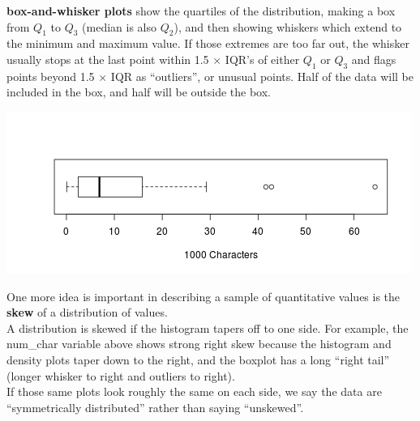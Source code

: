\begin{list}{}{}
\begin{list}{}{}
   \item [\bf box-and-whisker plots] show the quartiles of the
     distribution, making a box from $Q_1$ to $Q_3$ (median is also $Q_2$), and
     then showing whiskers which extend to the minimum and maximum
     value. If those extremes are too far out, the whisker usually
     stops at the last point within 1.5 $\times$ IQR's of either
     $Q_1$ or $Q_3$ and flags points beyond 1.5 $\times$ IQR as
     ``outliers'', or unusual points.  
     Half of the data will be included in the box, and half will be
     outside the box. \vspace{-1cm}
  \begin{center}
  \includegraphics[width = .8\linewidth]{../plots/boxplotDemo1.png} \vspace{-.5cm}
  \end{center}

\end{list}
\end{list}



One more idea is important in describing a sample of quantitative
values is the {\bf skew} of a distribution of values.  \\
  A distribution is skewed if the histogram tapers off to one
  side. For example, the num\_char variable above shows strong right
  skew because the histogram and density plots taper down to the
  right, and the boxplot has a long ``right tail'' (longer whisker to
  right and outliers to right).
\\
 If those same plots look roughly the same on each side, we say the
 data  are ``symmetrically distributed'' rather than saying ``unskewed''.

